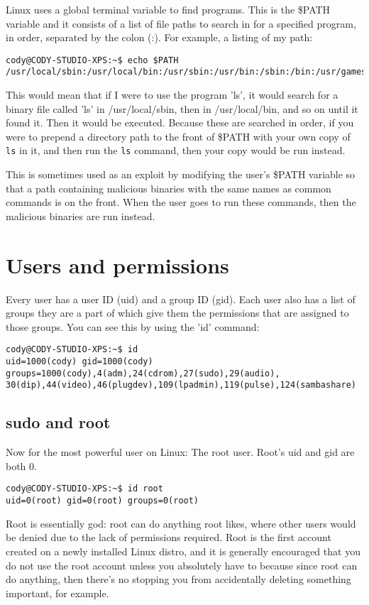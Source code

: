 \documentclass{article}
\begin{document}
Linux uses a global terminal variable to find programs. This is the \$PATH variable and it consists of a list of file paths to search in for a specified program, in order, separated by the colon (:). For example, a listing of my path:
\begin{verbatim}
cody@CODY-STUDIO-XPS:~$ echo $PATH
/usr/local/sbin:/usr/local/bin:/usr/sbin:/usr/bin:/sbin:/bin:/usr/games
\end{verbatim}
This would mean that if I were to use the program 'ls', it would search for a binary file called 'ls' in /usr/local/sbin, then in /usr/local/bin, and so on until it found it. Then it would be executed. Because these are searched in order, if you were to prepend a directory path to the front of \$PATH with your own copy of \texttt{ls} in it, and then run the \texttt{ls} command, then your copy would be run instead.

This is sometimes used as an exploit by modifying the user's \$PATH variable so that a path containing malicious binaries with the same names as common commands is on the front. When the user goes to run these commands, then the malicious binaries are run instead.

\section{Users and permissions}
Every user has a user ID (uid) and a group ID (gid). Each user also has a list of groups they are a part of which give them the permissions that are assigned to those groups. You can see this by using the 'id' command:
\begin{verbatim}
cody@CODY-STUDIO-XPS:~$ id
uid=1000(cody) gid=1000(cody) groups=1000(cody),4(adm),24(cdrom),27(sudo),29(audio),
30(dip),44(video),46(plugdev),109(lpadmin),119(pulse),124(sambashare)
\end{verbatim}

\subsection{sudo and root}
Now for the most powerful user on Linux: The root user. Root's uid and gid are both 0.
\begin{verbatim}
cody@CODY-STUDIO-XPS:~$ id root
uid=0(root) gid=0(root) groups=0(root)
\end{verbatim}
Root is essentially god: root can do anything root likes, where other users would be denied due to the lack of permissions required. Root is the first account created on a newly installed Linux distro, and it is generally encouraged that you do not use the root account unless you absolutely have to because since root can do anything, then there's no stopping you from accidentally deleting something important, for example.
\end{document}
